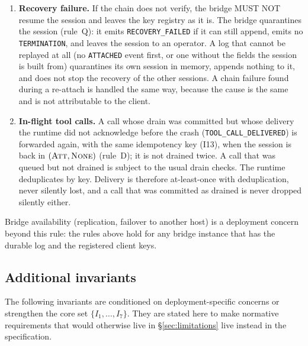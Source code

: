 \begin{enumerate}[leftmargin=2em]
\texttt{DETACH\_TIMEOUT} and \texttt{TERMINATION}; $T_{\text{detach}}$
itself has just restarted and cannot have elapsed. The expiry of an
approval, $T_{\text{approve}}$, is recorded as \texttt{valid\_until} in
\texttt{HUMAN\_RESOLVED}; recovery reads it back from the log, so an approval
that had lapsed before the restart stays lapsed.
\item \textbf{Recovery failure.} If the chain does not verify, the
bridge MUST NOT resume the session and leaves the key registry as it is.
The bridge quarantines the session (rule~Q): it
emits \texttt{RECOVERY\_FAILED} if it can still append, emits no
\texttt{TERMINATION}, and leaves the session to an operator.
A log that cannot be replayed at all (no \texttt{ATTACHED} event first, or
one without the fields the session is built from) quarantines its own
session in memory, appends nothing to it, and does not stop the recovery
of the other sessions. A chain
failure found during a re-attach is handled the same way, because the
cause is the same and is not attributable to the client.
\item \textbf{In-flight tool calls.} A call whose drain was committed
but whose delivery the runtime did not acknowledge before the crash
(\texttt{TOOL\_CALL\_DELIVERED}) is forwarded again, with the same
idempotency key (I13), when the session is back in
$(\textsc{Att},\textsc{None})$ (rule~D); it is not drained twice. A call
that was queued but not drained is subject to the usual drain checks. The
runtime deduplicates by key. Delivery is therefore at-least-once with
deduplication, never silently lost, and a call that was committed as
drained is never dropped silently either.
\end{enumerate}

Bridge availability (replication, failover to another host) is a
deployment concern beyond this rule: the rules above hold for any bridge
instance that has the durable log and the registered client keys.

\subsection{Additional invariants}\label{sec:additional-invariants}

The following invariants are conditioned on deployment-specific
concerns or strengthen the core set $\{I_1, \ldots, I_7\}$. They are
stated here to make normative requirements that would otherwise live
in \S\ref{sec:limitations} live instead in the specification.

